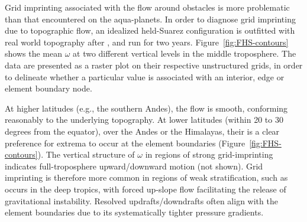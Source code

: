 \documentclass[twocol]{ametsoc}
\begin{document}
Grid imprinting associated with the flow around obstacles is more problematic than that encountered on the aqua-planets. In order to diagnose grid imprinting due to topographic flow, an idealized held-Suarez configuration \citep{HS1994} is outfitted with real world topography after \cite{FRETAL2000WMR,BETAL2006MWR}, and run for two years. Figure~\ref{fig:FHS-contours} shows the mean $\omega$ at two different vertical levels in the middle troposphere. {\color{red}The data are presented as a raster plot on their respective unstructured grids, in order to delineate whether a particular value is associated with an interior, edge or element boundary node.{}} 

At higher latitudes (e.g., the southern Andes), the flow is smooth, conforming reasonably to the underlying topography. At lower latitudes (within 20 to 30 degrees from the equator), over the Andes or the Himalayas, their is a clear preference for extrema to occur at the element boundaries (Figure~\ref{fig:FHS-contours}). The vertical structure of $\omega$ in regions of strong grid-imprinting indicates full-troposphere upward/downward motion (not shown). Grid imprinting is therefore more common in regions of weak stratification, such as occurs in the deep tropics, with forced up-slope flow facilitating the release of gravitational instability. Resolved updrafts/downdrafts often align with the element boundaries due to its systematically tighter pressure gradients. 
\end{document}
